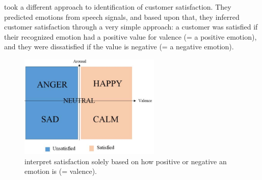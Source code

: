 \newline\newline \citet{Kamaruddin:2016:MeasuringCustomerSatisfaction} took a different approach to identification of customer satisfaction. They predicted emotions from speech signals, and based upon that, they inferred customer satisfaction through a very simple approach: a customer was satisfied if their recognized emotion had a positive value for valence (= a positive emotion), and they were dissatisfied if the value is negative (= a negative emotion).

\begin{figure}[H]
  \begin{center}
  \includegraphics[angle=0, width=0.6\textwidth]{Figures/Satisfaction_from_VA.PNG}
  \caption[Interpretation of emotions]{\citet{Kamaruddin:2016:MeasuringCustomerSatisfaction} interpret satisfaction solely based on how positive or negative an emotion is (= valence).}
  \label{fig:SatisfactionFromVA}
  \end{center}
\end{figure}

